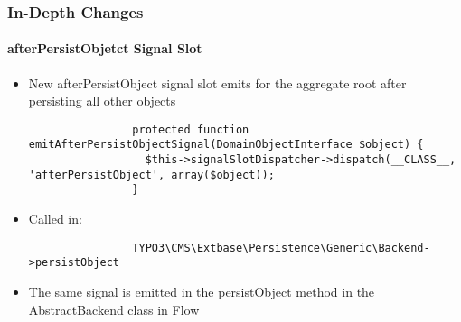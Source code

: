\begin{frame}[fragile]
	\frametitle{In-Depth Changes}
	\framesubtitle{afterPersistObjetct Signal Slot}

	\lstset{
		basicstyle=\tiny\ttfamily
	}

	\begin{itemize}

		\item New afterPersistObject signal slot emits for the aggregate root after persisting all other objects

			\begin{lstlisting}
				protected function emitAfterPersistObjectSignal(DomainObjectInterface $object) {
				  $this->signalSlotDispatcher->dispatch(__CLASS__, 'afterPersistObject', array($object));
				}
			\end{lstlisting}

		\item Called in:

			\begin{lstlisting}
				TYPO3\CMS\Extbase\Persistence\Generic\Backend->persistObject
			\end{lstlisting}

		\item The same signal is emitted in the persistObject method in the AbstractBackend class in Flow

	\end{itemize}

\end{frame}                                                 


